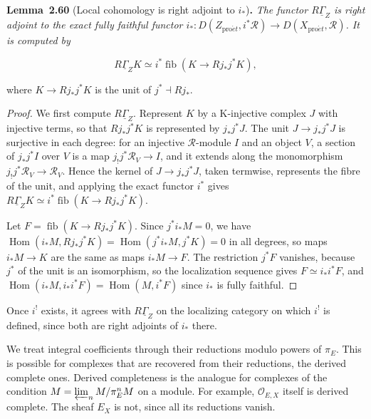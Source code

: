 \documentclass[11pt]{article}
\newenvironment{bpstatement}[2]{\par\addvspace{0.6\baselineskip}\noindent\textbf{#1}#2\textbf{.}\enspace\ignorespaces}
  {\par\addvspace{0.4\baselineskip}}
\newenvironment{bpstatementit}[2]{\begin{bpstatement}{#1}{#2}\itshape\ignorespaces}{\end{bpstatement}}
\providecommand{\fib}{}\renewcommand{\fib}{\operatorname{fib}}
\begin{document}
\label{bp183}%
\begin{bpstatementit}{Lemma~2.60}{ (Local cohomology is right adjoint to $i_*$)}
The functor \(R\underline\Gamma_Z\) is right adjoint to the exact fully faithful functor \(i_*:D(Z_{\mathrm{pro}\acute{e}t},i^*\mathcal R)\to D(X_{\mathrm{pro}\acute{e}t},\mathcal R)\). It is computed by

\[
R\underline\Gamma_ZK\simeq i^*\fib(K\longrightarrow Rj_*j^*K),
\]

where \(K\to Rj_*j^*K\) is the unit of \(j^*\dashv Rj_*\).
\end{bpstatementit}

\begin{proof}[{Proof}]\label{bp184}%
We first compute \(R\underline\Gamma_Z\). Represent \(K\) by a K-injective complex \(J\) with injective terms, so that \(Rj_*j^*K\) is represented by \(j_*j^*J\). The unit \(J\to j_*j^*J\) is surjective in each degree: for an injective \(\mathcal R\)-module \(I\) and an object \(V\), a section of \(j_*j^*I\) over \(V\) is a map \(j_!j^*\mathcal R_V\to I\), and it extends along the monomorphism \(j_!j^*\mathcal R_V\to\mathcal R_V\). Hence the kernel of \(J\to j_*j^*J\), taken termwise, represents the fibre of the unit, and applying the exact functor \(i^*\) gives \(R\underline\Gamma_ZK\simeq i^*\fib(K\to Rj_*j^*K)\).

Let \(F=\fib(K\to Rj_*j^*K)\). Since \(j^*i_*M=0\), we have \(\operatorname{Hom}(i_*M,Rj_*j^*K)=\operatorname{Hom}(j^*i_*M,j^*K)=0\) in all degrees, so maps \(i_*M\to K\) are the same as maps \(i_*M\to F\). The restriction \(j^*F\) vanishes, because \(j^*\) of the unit is an isomorphism, so the localization sequence gives \(F\simeq i_*i^*F\), and \(\operatorname{Hom}(i_*M,i_*i^*F)=\operatorname{Hom}(M,i^*F)\) since \(i_*\) is fully faithful.
\end{proof}

\label{bp185}%
Once \(i^!\) exists, it agrees with \(R\underline\Gamma_Z\) on the localizing category on which \(i^!\) is defined, since both are right adjoints of \(i_*\) there.

We treat integral coefficients through their reductions modulo powers of \(\pi_E\). This is possible for complexes that are recovered from their reductions, the derived complete ones. Derived completeness is the analogue for complexes of the condition \(M=\varprojlim_nM/\pi_E^nM\) on a module. For example, \(\mathcal O_{E,X}\) itself is derived complete. The sheaf \(E_X\) is not, since all its reductions vanish.
\end{document}
